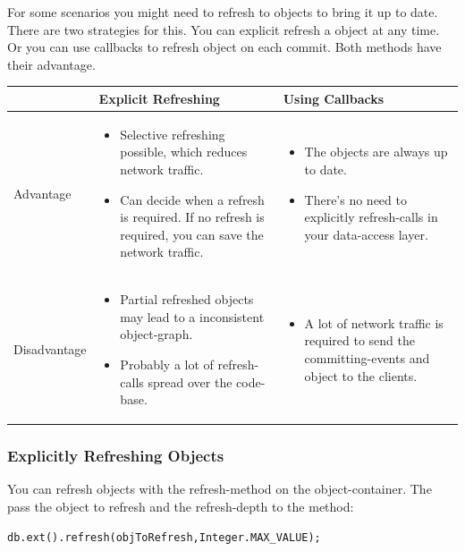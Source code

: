 For some scenarios you might need to refresh to objects to bring it up to date. There are two strategies for this. You can explicit refresh a object at any time. Or you can use callbacks to refresh object on each commit. Both methods have their advantage.

{\small
\begin{longtable}{|p{}|p{}|p{}|}
\hline
 & Explicit Refreshing & Using Callbacks \\ \hline
Advantage & \begin{itemize}
\item Selective refreshing possible, which reduces network traffic.
\item Can decide when a refresh is required. If no refresh is required, you can save the network traffic.
\end{itemize} & \begin{itemize}
\item The objects are always up to date.
\item There's no need to explicitly refresh-calls in your data-access layer.
\end{itemize} \\ \hline
Disadvantage & \begin{itemize}
\item Partial refreshed objects may lead to a inconsistent object-graph.
\item Probably a lot of refresh-calls spread over the code-base.
\end{itemize} & \begin{itemize}
\item A lot of network traffic is required to send the committing-events and object to the clients.
\end{itemize} \\ \hline
\end{longtable}}

\subsubsection*{Explicitly Refreshing Objects}

You can refresh objects with the refresh-method on the object-container. The pass the object to refresh and the refresh-depth to the method:

\begin{lstlisting}
db.ext().refresh(objToRefresh,Integer.MAX_VALUE);
\end{lstlisting}

